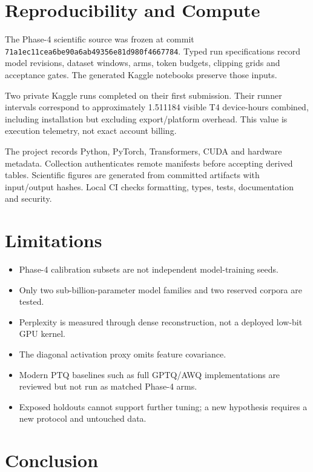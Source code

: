 \documentclass[10pt,twocolumn]{article}
\begin{document}
\section{Reproducibility and Compute}

The Phase-4 scientific source was frozen at commit
\texttt{71a1ec11cea6be90a6ab49356e81d980f4667784}. Typed run specifications record
model revisions, dataset windows, arms, token budgets, clipping grids and
acceptance gates. The generated Kaggle notebooks preserve those inputs.

Two private Kaggle runs completed on their first submission. Their runner
intervals correspond to approximately 1.511184 visible T4 device-hours combined,
including installation but excluding export/platform overhead. This value is
execution telemetry, not exact account billing.

The project records Python, PyTorch, Transformers, CUDA and hardware metadata.
Collection authenticates remote manifests before accepting derived tables.
Scientific figures are generated from committed artifacts with input/output
hashes. Local CI checks formatting, types, tests, documentation and security.

\section{Limitations}

\begin{itemize}
  \item Phase-4 calibration subsets are not independent model-training seeds.
  \item Only two sub-billion-parameter model families and two reserved corpora
  are tested.
  \item Perplexity is measured through dense reconstruction, not a deployed
  low-bit GPU kernel.
  \item The diagonal activation proxy omits feature covariance.
  \item Modern PTQ baselines such as full GPTQ/AWQ implementations are reviewed
  but not run as matched Phase-4 arms.
  \item Exposed holdouts cannot support further tuning; a new hypothesis
  requires a new protocol and untouched data.
\end{itemize}

\section{Conclusion}
\end{document}

